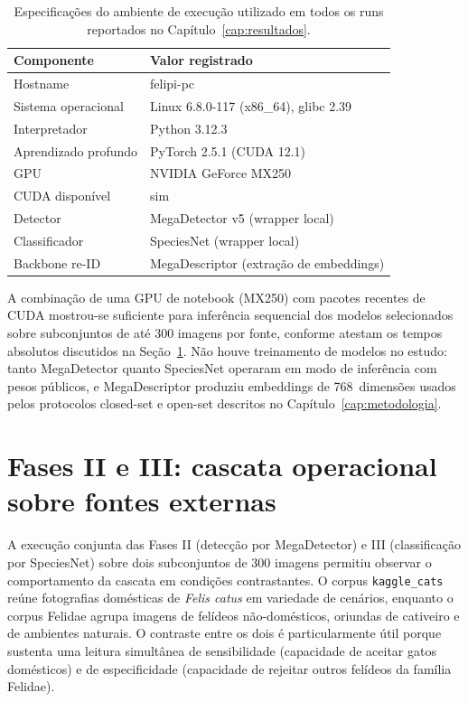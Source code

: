 \begin{table}[!htb]
  \centering
  \caption[Ambiente de execução utilizado nos experimentos.]{Especificações do ambiente de execução utilizado em todos os runs reportados no Capítulo~\ref{cap:resultados}.}
  \label{tab:cap5-ambiente}
  \begin{tabular}{ll}
    \toprule
    \textbf{Componente} & \textbf{Valor registrado} \\
    \midrule
    Hostname            & felipi-pc \\
    Sistema operacional & Linux 6.8.0-117 (x86\_64), glibc 2.39 \\
    Interpretador       & Python 3.12.3 \\
    Aprendizado profundo & PyTorch 2.5.1 (CUDA 12.1) \\
    GPU                 & NVIDIA GeForce MX250 \\
    CUDA disponível     & sim \\
    Detector            & MegaDetector v5 (wrapper local) \\
    Classificador       & SpeciesNet (wrapper local) \\
    Backbone re-ID      & MegaDescriptor (extração de embeddings) \\
    \bottomrule
  \end{tabular}
\end{table}

A combinação de uma GPU de notebook (MX250) com pacotes recentes de CUDA mostrou-se suficiente para inferência sequencial dos modelos selecionados sobre subconjuntos de até 300 imagens por fonte, conforme atestam os tempos absolutos discutidos na Seção~\ref{sec:res-cascata}. Não houve treinamento de modelos no estudo: tanto MegaDetector quanto SpeciesNet operaram em modo de inferência com pesos públicos, e MegaDescriptor produziu embeddings de 768~dimensões usados pelos protocolos closed-set e open-set descritos no Capítulo~\ref{cap:metodologia}.

\section{Fases II e III: cascata operacional sobre fontes externas}
\label{sec:res-cascata}

A execução conjunta das Fases II (detecção por MegaDetector) e III (classificação por SpeciesNet) sobre dois subconjuntos de 300 imagens permitiu observar o comportamento da cascata em condições contrastantes. O corpus \texttt{kaggle\_cats} \cite{cat_dataset_kaggle_2024} reúne fotografias domésticas de \textit{Felis catus} em variedade de cenários, enquanto o corpus Felidae \cite{felidae_dataset_gts} agrupa imagens de felídeos não-domésticos, oriundas de cativeiro e de ambientes naturais. O contraste entre os dois é particularmente útil porque sustenta uma leitura simultânea de sensibilidade (capacidade de aceitar gatos domésticos) e de especificidade (capacidade de rejeitar outros felídeos da família Felidae).

